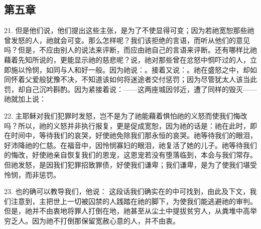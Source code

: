 \subsection{第五章}

\par

21. 但是他们说，他们提出这些主张，是为了不使显得可变；因为若祂宽恕那些祂曾发怒的人，祂就会可变。那么怎样呢？我们该拒绝的言语，而听从他们的意见吗？但是，不应由别人的说法来评断，而应由祂自己的言语来评断。还有哪样比祂藉着先知所说的，更能显示祂的慈悲呢？说，祂对那些曾在忿怒中恫吓过的人，立即施以怜悯，如同与人和好一般。因为祂说：。接着又说：。祂在盛怒之中，却如同怀着父爱般犹豫不决，不知道该如何将迷途者交付惩罚；因为尽管犹太人该当此罚，却自己沉吟斟酌。因为紧接着说：——这两座城因邻近，遭了同样的毁灭——祂就加上说：\par

22. 主耶稣对我们犯罪时发怒，岂不是为了祂能藉着惧怕祂的义怒而使我们悔改吗？所以，祂的义怒并非执行报复，更是促成宽恕，因为祂的话是：祂在此时，即在时间中，等待我们的哀哭，好使祂免除我们那永恒的哀哭。祂等待我们的眼泪，好沛降祂的仁慈。在福音中，因怜悯寡妇的眼泪，祂复活了她的儿子。祂等待我们的悔改，好使祂亲自恢复我们的恩宠，这恩宠若没有堕落临到，本会与我们常存。但祂发怒，是因我们犯罪招致罪债，好使我们谦卑；我们谦卑，是为了使我们堪受怜悯，而非惩罚。\par

23. 也的确可以教导我们，他说： 这段话我们确实在的中可找到，由此及下文，我们注意到，主把世上一切被囚禁的人践踏在祂的脚下，为使我们能逃避祂的审判。但是，祂并不由衷地将罪人打倒在地，祂甚至从尘土中提拔贫穷人，从粪堆中高举穷乏人。因为祂不打倒那保留宽赦心意的人，并不由衷。\par


